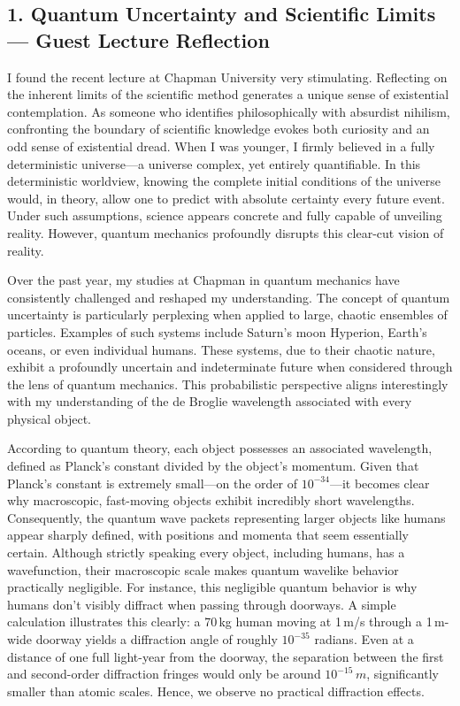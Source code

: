 \documentclass{article}
\theoremstyle{theorem}
\theoremstyle{definition}
\theoremstyle{remark}
\begin{document}
\subsection*{1. Quantum Uncertainty and Scientific Limits — Guest Lecture Reflection}

I found the recent lecture at Chapman University very stimulating. Reflecting on the inherent limits of the scientific method generates a unique sense of existential contemplation. As someone who identifies philosophically with absurdist nihilism, confronting the boundary of scientific knowledge evokes both curiosity and an odd sense of existential dread. When I was younger, I firmly believed in a fully deterministic universe—a universe complex, yet entirely quantifiable. In this deterministic worldview, knowing the complete initial conditions of the universe would, in theory, allow one to predict with absolute certainty every future event. Under such assumptions, science appears concrete and fully capable of unveiling reality. However, quantum mechanics profoundly disrupts this clear-cut vision of reality.

Over the past year, my studies at Chapman in quantum mechanics have consistently challenged and reshaped my understanding. The concept of quantum uncertainty is particularly perplexing when applied to large, chaotic ensembles of particles. Examples of such systems include Saturn’s moon Hyperion, Earth's oceans, or even individual humans. These systems, due to their chaotic nature, exhibit a profoundly uncertain and indeterminate future when considered through the lens of quantum mechanics. This probabilistic perspective aligns interestingly with my understanding of the de Broglie wavelength associated with every physical object.

According to quantum theory, each object possesses an associated wavelength, defined as Planck's constant divided by the object's momentum. Given that Planck's constant is extremely small—on the order of \(10^{-34}\)—it becomes clear why macroscopic, fast-moving objects exhibit incredibly short wavelengths. Consequently, the quantum wave packets representing larger objects like humans appear sharply defined, with positions and momenta that seem essentially certain. Although strictly speaking every object, including humans, has a wavefunction, their macroscopic scale makes quantum wavelike behavior practically negligible. For instance, this negligible quantum behavior is why humans don't visibly diffract when passing through doorways. A simple calculation illustrates this clearly: a 70\,kg human moving at 1\,m/s through a 1\,m-wide doorway yields a diffraction angle of roughly \(10^{-35}\) radians. Even at a distance of one full light-year from the doorway, the separation between the first and second-order diffraction fringes would only be around \(10^{-15}\,m\), significantly smaller than atomic scales. Hence, we observe no practical diffraction effects.
\end{document}
